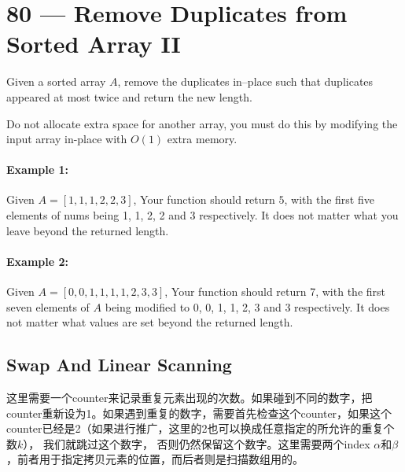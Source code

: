 \section{80 --- Remove Duplicates from Sorted Array II}
Given a sorted array $A$, remove the duplicates in--place such that duplicates appeared at most twice and return the new length.
\par
Do not allocate extra space for another array, you must do this by modifying the input array in-place with $O(1)$ extra memory.
\paragraph{Example 1:}
\begin{flushleft}
Given $A = [1,1,1,2,2,3]$, Your function should return $5$, with the first five elements of nums being 1, 1, 2, 2 and 3 respectively. It does not matter what you leave beyond the returned length.
\end{flushleft}
\paragraph{Example 2:}
\begin{flushleft}
Given $A = [0,0,1,1,1,1,2,3,3]$, Your function should return 7, with the first seven elements of $A$ being modified to 0, 0, 1, 1, 2, 3 and 3 respectively. It does not matter what values are set beyond the returned length.
\end{flushleft}
\subsection{Swap And Linear Scanning}
\begin{CJK*}{UTF8}{gbsn}
这里需要一个counter来记录重复元素出现的次数。如果碰到不同的数字，把counter重新设为1。如果遇到重复的数字，需要首先检查这个counter，如果这个counter已经是2（如果进行推广，这里的2也可以换成任意指定的所允许的重复个数$k$）， 我们就跳过这个数字， 否则仍然保留这个数字。这里需要两个index $\alpha$和$\beta$，前者用于指定拷贝元素的位置，而后者则是扫描数组用的。
\end{CJK*}
